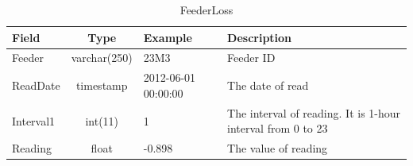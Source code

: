 \documentclass[a4paper,12pt]{llncs}
\begin{document}
\begin{table}[htp]
\centering
\caption{FeederLoss}
\begin{tabular}{|l|c|l|p{8.5cm}|}
 \hline
 {\bf Field}       & {\bf Type} & {\bf Example}     & {\bf Description } \\ \hline
Feeder   &varchar(250)& 23M3 & Feeder ID  \\ \hline
ReadDate &timestamp   & 2012-06-01 00:00:00 &  The date of read \\ \hline
Interval1&int(11)     & 1 &  The interval of reading. It is 1-hour interval from 0 to 23 \\ \hline
Reading  &float       &-0.898  & The value of reading  \\ \hline
\end{tabular}
\end{table}
\end{document}
